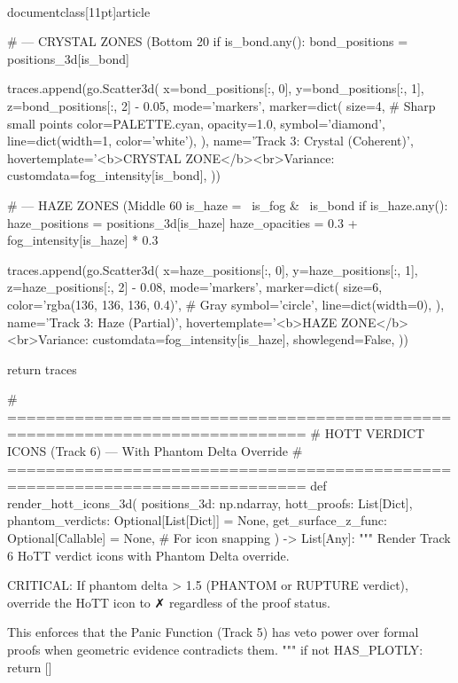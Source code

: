\\documentclass[11pt]{article}
\begin{document}
\begin{CodeBlock}
{{{    # --- CRYSTAL ZONES (Bottom 20%
    if is_bond.any():
        bond_positions = positions_3d[is_bond]

        traces.append(go.Scatter3d(
            x=bond_positions[:, 0],
            y=bond_positions[:, 1],
            z=bond_positions[:, 2] - 0.05,
            mode='markers',
            marker=dict(
                size=4,  # Sharp small points
                color=PALETTE.cyan,
                opacity=1.0,
                symbol='diamond',
                line=dict(width=1, color='white'),
            ),
            name='Track 3: Crystal (Coherent)',
            hovertemplate='<b>CRYSTAL ZONE</b><br>Variance: %
            customdata=fog_intensity[is_bond],
        ))

    # --- HAZE ZONES (Middle 60%
    is_haze = ~is_fog & ~is_bond
    if is_haze.any():
        haze_positions = positions_3d[is_haze]
        haze_opacities = 0.3 + fog_intensity[is_haze] * 0.3

        traces.append(go.Scatter3d(
            x=haze_positions[:, 0],
            y=haze_positions[:, 1],
            z=haze_positions[:, 2] - 0.08,
            mode='markers',
            marker=dict(
                size=6,
                color='rgba(136, 136, 136, 0.4)',  # Gray
                symbol='circle',
                line=dict(width=0),
            ),
            name='Track 3: Haze (Partial)',
            hovertemplate='<b>HAZE ZONE</b><br>Variance: %
            customdata=fog_intensity[is_haze],
            showlegend=False,
        ))

    return traces


# =============================================================================
# HOTT VERDICT ICONS (Track 6) — With Phantom Delta Override
# =============================================================================
def render_hott_icons_3d(
    positions_3d: np.ndarray,
    hott_proofs: List[Dict],
    phantom_verdicts: Optional[List[Dict]] = None,
    get_surface_z_func: Optional[Callable] = None, # For icon snapping
) -> List[Any]:
    """
    Render Track 6 HoTT verdict icons with Phantom Delta override.

    CRITICAL: If phantom delta > 1.5 (PHANTOM or RUPTURE verdict),
    override the HoTT icon to ✗ regardless of the proof status.

    This enforces that the Panic Function (Track 5) has veto power
    over formal proofs when geometric evidence contradicts them.
    """
    if not HAS_PLOTLY:
        return []

}}}
\end{CodeBlock}
\end{document}
